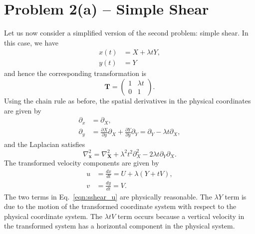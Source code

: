 \documentclass[11pt]{article}
\newcommand{\p}{\partial}
\newcommand{\bT}{\mathbf{T}}
\newcommand{\bX}{\mathbf{X}}
\newcommand{\bx}{\mathbf{x}}
\begin{document}
\section*{Problem 2(a) -- Simple Shear}
Let us now consider a simplified version of the second problem: simple shear. In this case, we have
\begin{align}
    x(t) &= X + \lambda t Y, \label{eqn:sshear_x} \\
    y(t) &= Y \label{eqn:sshear_y}
\end{align}
and hence the corresponding transformation is
\begin{equation}
    \bT = \begin{pmatrix} 1 & \lambda t \\ 0 & 1 \end{pmatrix}.
\end{equation}
Using the chain rule as before, the spatial derivatives in the physical
coordinates are given by
\begin{align}
    \p_x &= \p_X, \label{eqn:sshear_d/dx} \\
    \p_y &= \frac{\p X}{\p y}\p_X + \frac{\p Y}{\p y}\p_Y = \p_Y - \lambda t \p_X,
    \label{eqn:sshear_d/dy}
\end{align}
and the Laplacian satisfies
\begin{equation}
    \nabla_\bx^2 = \nabla_\bX^2 + \lambda^2t^2\p_X^2 - 2\lambda t\p_Y\p_X.
    \label{eqn:sshear_lapl}
\end{equation}
The transformed velocity components are given by
\begin{align}
    u &= \frac{dx}{dt} = U + \lambda (Y + tV), \label{eqn:sshear_u}\\
    v &= \frac{dy}{dt} = V. \label{eqn:sshear_v}
\end{align}
The two terms in Eq.~\ref{eqn:sshear_u} are physically reasonable. The $\lambda Y$ term is due to the motion of the transformed coordinate system with respect to the physical coordinate system. The $\lambda t V$ term occurs because a vertical velocity in the transformed system has a horizontal component in the physical system.
\end{document}
